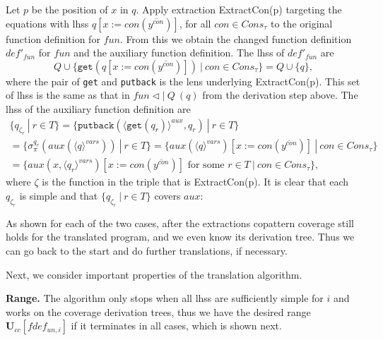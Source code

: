 \begin{algorithm}
\begin{enumerate}
Let $p$ be the position of $x$ in $q$. Apply extraction \textsf{ExtractCon}(p) targeting the equations with lhss $q[x := con(\overline{y^{con}})]$, for all $con \in Cons_\tau$ to the original function definition for $fun$. From this we obtain the changed function definition $def'_{fun}$ for $fun$ and the auxiliary function definition. The lhss of $def'_{fun}$ are
\[
Q \cup \{ \texttt{get}(q[x := con(\overline{y^{con}})]) ~ | ~ con \in Cons_\tau \} = Q \cup \{q\},
\]
where the pair of \texttt{get} and \texttt{putback} is the lens underlying \textsf{ExtractCon}(p). This set of lhss is the same as that in $fun \lhd | ~ Q ~ (q)$ from the derivation step above. The lhss of the auxiliary function definition are
\begin{multline*}
\{ q_{\zeta_r} ~ | ~ r \in T \} = \{ \texttt{putback}(\langle \texttt{get}(q_r) \rangle^{aux}, q_r) ~ | ~ r \in T \} \\
= \{ \sigma^{q_r}_\pi(aux(\langle q \rangle^{vars})) ~ | ~ r \in T \} = \{ aux(\langle q \rangle^{vars})[x := con(\overline{y^{con}})] ~ | ~ con \in Cons_\tau \} \\
= \{ aux(x, \langle q_r \rangle^{vars})[x := con(\overline{y^{con}})] \text{ for some } r \in T ~ | ~ con \in Cons_\tau \},
\end{multline*}
where $\zeta$ is the function in the triple that is \textsf{ExtractCon}(p). It is clear that each $q_{\zeta_r}$ is simple and that $\{ q_{\zeta_r} ~ | ~ r \in T \}$ covers $aux$:
\begin{prooftree}
\AxiomC{}
\end{prooftree}
\end{enumerate}

As shown for each of the two cases, after the extractions copattern coverage still holds for the translated program, and we even know its derivation tree. Thus we can go back to the start and do further translations, if necessary.
\end{algorithm}

Next, we consider important properties of the translation algorithm.

\textbf{Range.} The algorithm only stops when all lhss are sufficiently simple for $i$ and works on the coverage derivation trees, thus we have the desired range $\mathbf{U}_{cc}[fdef_{un,i}]$ if it terminates in all cases, which is shown next.

